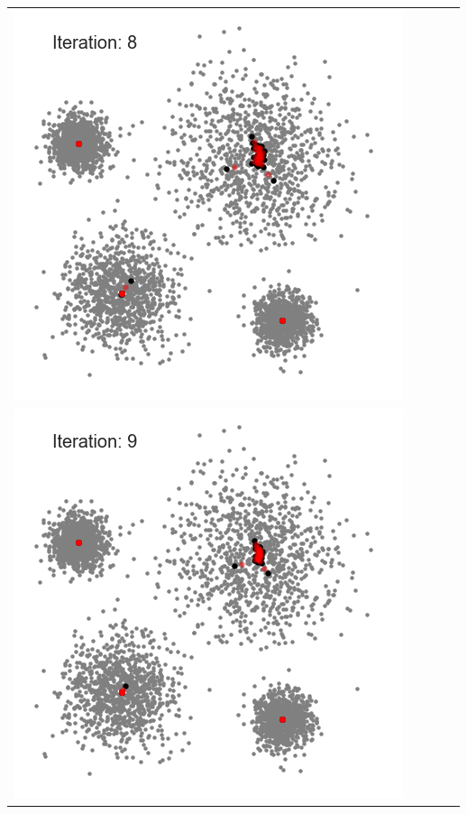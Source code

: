 \documentclass{beamer}
\begin{document}
\begin{frame}
{\begin{tabular}{ccccc}
	\includegraphics[scale=0.15]{meanshift/meanshift-20}\\
	\includegraphics[scale=0.15]{meanshift/meanshift-22}&

\end{tabular}}
\end{frame}
\end{document}
